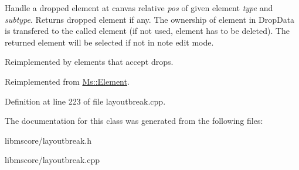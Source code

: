 Handle a dropped element at canvas relative {\itshape pos} of given element {\itshape type} and {\itshape subtype}. Returns dropped element if any. The ownership of element in Drop\+Data is transfered to the called element (if not used, element has to be deleted). The returned element will be selected if not in note edit mode.

Reimplemented by elements that accept drops. 

Reimplemented from \hyperlink{class_ms_1_1_element_a0ca69a9fb48e7b9fb481aacaf3860032}{Ms\+::\+Element}.



Definition at line 223 of file layoutbreak.\+cpp.



The documentation for this class was generated from the following files\+:\begin{DoxyCompactItemize}
\item 
libmscore/layoutbreak.\+h\item 
libmscore/layoutbreak.\+cpp\end{DoxyCompactItemize}
